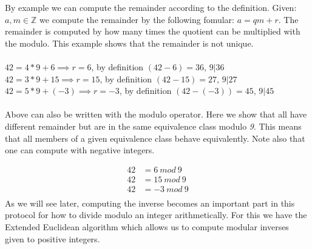 By example we can compute the remainder according to the definition. Given: \begin{math} a, m \in \mathbb{Z} \end{math} we compute the remainder by the following fomular:  \begin{math} a = qm +r \end{math}. The remainder is computed by how many times the quotient can be multiplied with the modulo. This example shows that the remainder is not unique. \\\\
\begin{math}42 = 4 * 9 +6 \implies r = 6 \end{math}, by definition \begin{math} (42-6) = 36 \end{math}, \begin{math} 9| 36 \end{math}\\
\begin{math}42 = 3 * 9 +15 \implies r = 15 \end{math}, by definition \begin{math} (42-15) = 27 \end{math}, \begin{math} 9| 27 \end{math}\\
\begin{math}42 = 5 * 9 +(-3) \implies r = -3 \end{math}, by definition \begin{math} (42-(-3)) = 45 \end{math}, \begin{math} 9| 45 \end{math}\\\\

 Above can also be written with the modulo operator. Here we show that all have different remainder but are in the same equivalence class modulo \textit{9}. This means that all members of a given equivalence class behave equivalently. Note also that one can compute with negative integers.

\begin{align*}
42 &= 6 \ mod \ 9 \\
42 &= 15 \ mod \ 9 \\
42 &= -3 \ mod \ 9 \\
\end{align*}
As we will see later, computing the inverse becomes an important part in this protocol for how to divide modulo an integer arithmetically. For this we have the Extended Euclidean algorithm which allows us to compute modular inverses given to positive integers. \\


